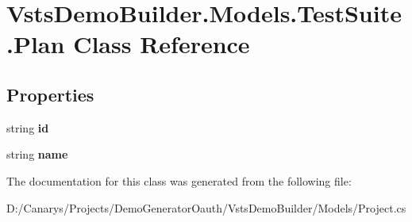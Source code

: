 \hypertarget{class_vsts_demo_builder_1_1_models_1_1_test_suite_1_1_plan}{}\section{Vsts\+Demo\+Builder.\+Models.\+Test\+Suite.\+Plan Class Reference}
\label{class_vsts_demo_builder_1_1_models_1_1_test_suite_1_1_plan}
\subsection*{Properties}
\begin{DoxyCompactItemize}
\item 
\mbox{\label{class_vsts_demo_builder_1_1_models_1_1_test_suite_1_1_plan_a05461d82b84396d383d9932e1661d87c}} 
string {\bfseries id}
\item 
\mbox{\label{class_vsts_demo_builder_1_1_models_1_1_test_suite_1_1_plan_a9c02984bb9d5deaa1d8376091729a155}} 
string {\bfseries name}
\end{DoxyCompactItemize}


The documentation for this class was generated from the following file\+:\begin{DoxyCompactItemize}
\item 
D\+:/\+Canarys/\+Projects/\+Demo\+Generator\+Oauth/\+Vsts\+Demo\+Builder/\+Models/Project.\+cs\end{DoxyCompactItemize}
